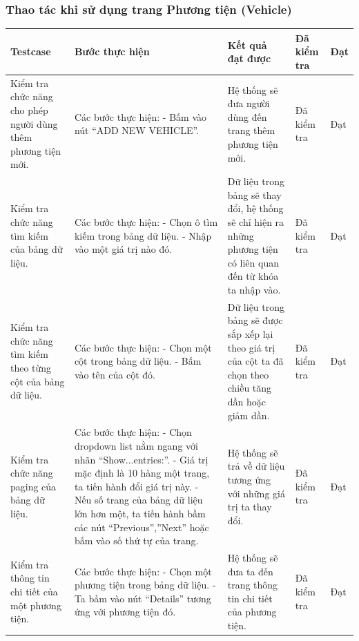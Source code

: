 \documentclass[a4paper]{article}
\begin{document}
\subsubsection*{Thao tác khi sử dụng trang Phương tiện (Vehicle) }
\begin{longtable}{ | p{} |p{} | p{}  | p{}  | p{}  | } 
\hline
\textbf{Testcase}& \textbf{Bước thực hiện}& \textbf{Kết quả đạt được} & \textbf{Đã kiểm tra}& \textbf{Đạt} \\ 
\hline
\hline
Kiểm tra chức năng cho phép người dùng thêm phương tiện mới. &
Các bước thực hiện: \newline
- Bấm vào nút “ADD NEW VEHICLE”.
&
Hệ thống sẽ đưa người dùng đến trang thêm phương tiện mới. &
Đã kiểm tra &
Đạt \\

\hline
Kiểm tra chức năng tìm kiếm của bảng dữ liệu. &
Các bước thực hiện: \newline
- Chọn ô tìm kiếm trong bảng dữ liệu. \newline
- Nhập vào một giá trị nào đó.	
&
Dữ liệu trong bảng sẽ thay đổi, hệ thống sẽ chỉ hiện ra những phương tiện có liên quan đến từ khóa ta nhập vào. &
Đã kiểm tra &
Đạt \\

\hline
Kiểm tra chức năng tìm kiếm theo từng cột của bảng dữ liệu. &
Các bước thực hiện: \newline
- Chọn một cột trong bảng dữ liệu.  \newline
- Bấm vào tên của cột đó. 
&
Dữ liệu trong bảng sẽ được sắp xếp lại theo giá trị của cột ta đã chọn theo chiều tăng dần hoặc giảm dần. &
Đã kiểm tra &
Đạt \\

\hline
Kiểm tra chức năng paging của bảng dữ liệu. &
Các bước thực hiện: \newline
- Chọn dropdown list nằm ngang với nhãn “Show...entries:”.   \newline
- Giá trị mặc định là 10 hàng một trang, ta tiến hành đổi giá trị này. \newline
- Nếu số trang của bảng dữ liệu lớn hơn một, ta tiến hành bầm các nút “Previous”,”Next” hoặc bấm vào số thứ tự của trang.
&
Hệ thống sẽ trả về dữ liệu tương ứng với những giá trị ta thay đổi. &
Đã kiểm tra &
Đạt \\

\hline
Kiểm tra thông tin chi tiết của một phương tiện. &
Các bước thực hiện: \newline
- Chọn một phương tiện trong bảng dữ liệu.   \newline
- Ta bấm vào nút “Details” tương ứng với phương tiện đó. 
&
Hệ thống sẽ đưa ta đến trang thông tin chi tiết của phương tiện. &
Đã kiểm tra &
Đạt \\


\end{longtable}
\end{document}
